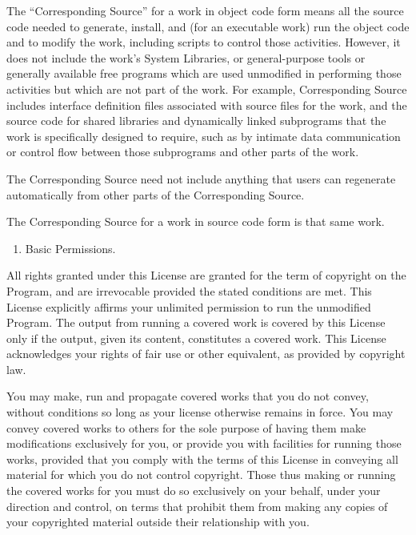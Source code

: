 \documentclass[letterpaper,10pt,english]{sphinxmanual}
\begin{document}
The “Corresponding Source” for a work in object code form means all
the source code needed to generate, install, and (for an executable
work) run the object code and to modify the work, including scripts to
control those activities.  However, it does not include the work’s
System Libraries, or general-purpose tools or generally available free
programs which are used unmodified in performing those activities but
which are not part of the work.  For example, Corresponding Source
includes interface definition files associated with source files for
the work, and the source code for shared libraries and dynamically
linked subprograms that the work is specifically designed to require,
such as by intimate data communication or control flow between those
subprograms and other parts of the work.

The Corresponding Source need not include anything that users
can regenerate automatically from other parts of the Corresponding
Source.

The Corresponding Source for a work in source code form is that
same work.
\begin{enumerate}
%
\setcounter{enumi}{1}
\item {} 
Basic Permissions.

\end{enumerate}

All rights granted under this License are granted for the term of
copyright on the Program, and are irrevocable provided the stated
conditions are met.  This License explicitly affirms your unlimited
permission to run the unmodified Program.  The output from running a
covered work is covered by this License only if the output, given its
content, constitutes a covered work.  This License acknowledges your
rights of fair use or other equivalent, as provided by copyright law.

You may make, run and propagate covered works that you do not
convey, without conditions so long as your license otherwise remains
in force.  You may convey covered works to others for the sole purpose
of having them make modifications exclusively for you, or provide you
with facilities for running those works, provided that you comply with
the terms of this License in conveying all material for which you do
not control copyright.  Those thus making or running the covered works
for you must do so exclusively on your behalf, under your direction
and control, on terms that prohibit them from making any copies of
your copyrighted material outside their relationship with you.
\end{document}
